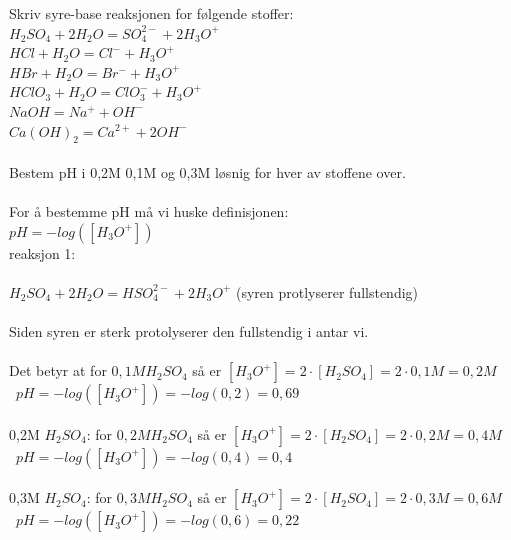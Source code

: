 \documentclass{minmal}
\begin{document}
\noindent Skriv syre-base reaksjonen for følgende stoffer:\\
$H_2SO_4+2H_2O=SO_4^{2-}+2H_3O^+$\\
$HCl+H_2O=Cl^-+H_3O^+$\\
$HBr+H_2O=Br^-+H_3O^+$\\
$HClO_3+H_2O=ClO_3^-+H_3O^+$\\
$NaOH=Na^++OH^-$\\
$Ca(OH)_2=Ca^{2+}+2OH^-$\\\\
Bestem pH i 0,2M 0,1M og 0,3M løsnig for hver av stoffene over.\\\\
For å bestemme pH må vi huske definisjonen:\\
$pH=-log([H_3O^+])$\\
reaksjon 1:\\\\
$H_2SO_4+2H_2O=HSO_4^{2-}+2H_3O^+$  (syren protlyserer fullstendig)\\\\
Siden syren er sterk protolyserer den fullstendig i antar vi.\\\\

\noindent Det betyr at for $0,1M H_2SO_4$ så er $[H_3O^+]=2\cdot [H_2SO_4]=2\cdot0,1M=0,2M$\\\
$pH=-log([H_3O^+])=-log(0,2)=0,69$\\\\
0,2M $H_2SO_4$:
for $0,2M H_2SO_4$ så er $[H_3O^+]=2\cdot [H_2SO_4]=2\cdot0,2M=0,4M$\\\
$pH=-log([H_3O^+])=-log(0,4)=0,4$\\\\
0,3M $H_2SO_4$:
for $0,3M H_2SO_4$ så er $[H_3O^+]=2\cdot [H_2SO_4]=2\cdot0,3M=0,6M$\\\
$pH=-log([H_3O^+])=-log(0,6)=0,22$\\\\
\end{document}
